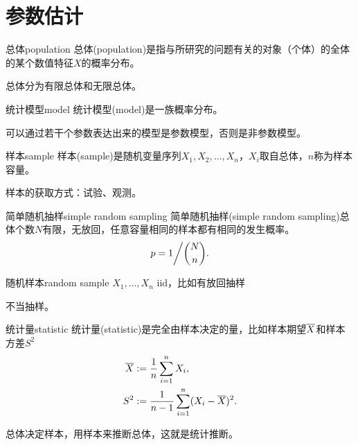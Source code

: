 \chapter{参数估计}

\begin{definition}{总体}{population}
	总体(population)是指与所研究的问题有关的对象（个体）的全体的某个数值特征$X$的概率分布。
\end{definition}
总体分为有限总体和无限总体。
\begin{definition}{统计模型}{model}
	统计模型(model)是一族概率分布。
\end{definition}
可以通过若干个参数表达出来的模型是参数模型，否则是非参数模型。
\begin{definition}{样本}{sample}
	样本(sample)是随机变量序列$X_1,X_2,\ldots,X_n$，$X_i$取自总体，$n$称为样本容量。
\end{definition}
样本的获取方式：试验、观测。
\begin{definition}{简单随机抽样}{simple random sampling}
	简单随机抽样(simple random sampling)总体个数$N$有限，无放回，任意容量相同的样本都有相同的发生概率。
	\[
		p = {1}\bigg/{\binom Nn}.
	\]
\end{definition}
\begin{definition}{随机样本}{random sample}
	$X_1,\ldots,X_n$ iid，比如有放回抽样
\end{definition}
不当抽样。
\begin{definition}{统计量}{statistic}
	统计量(statistic)是完全由样本决定的量，比如样本期望$\overline{X}$和样本方差$S^2$
	\begin{align*}
		\overline{X} &:= \frac1n\sum_{i=1}^nX_i,\\
		S^2 &:= \frac1{n - 1}\sum_{i=1}^n(X_i - \overline{X})^2.
	\end{align*}
\end{definition}
总体决定样本，用样本来推断总体，这就是统计推断。

